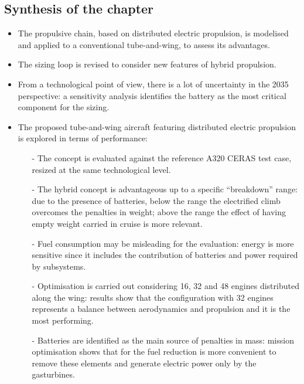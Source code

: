 \begin{mdframed}[hidealllines=true,backgroundcolor=blue!20]
	\section*{Synthesis of the chapter}
	
	\begin{itemize}
		
		\item The propulsive chain, based on distributed electric propulsion, is modelised and applied to a conventional tube-and-wing, to assess its advantages. 
		
		\item The sizing loop is revised to consider new features of hybrid propulsion. 
		
		\item From a technological point of view, there is a lot of uncertainty in the 2035 perspective: a sensitivity analysis identifies the battery as the most critical component for the sizing. 
		
		\item The proposed tube-and-wing aircraft featuring distributed electric propulsion is explored in terms of performance:
		\begin{itemize}
			
			\item[-] The concept is evaluated against the reference A320 CERAS test case, resized at the same technological level. 
			
			\item[-] The hybrid concept is advantageous up to a specific ``breakdown'' range: due to the presence of batteries, below the range the electrified climb overcomes the penalties in weight; above the range the effect of having empty weight carried in cruise is more relevant. 
			
			\item[-] Fuel consumption may be misleading for the evaluation: energy is more sensitive since it includes the contribution of batteries and power required by subsystems. 
			
			\item[-] Optimisation is carried out considering 16, 32 and 48 engines distributed along the wing: results show that the configuration with 32 engines represents a balance between aerodynamics and propulsion and it is the most performing.
			
			\item[-] Batteries are identified as the main source of penalties in mass: mission optimisation shows that for the fuel reduction is more convenient to remove these elements and generate electric power only by the gasturbines. 
		\end{itemize}
		

\end{itemize}
\end{mdframed}
